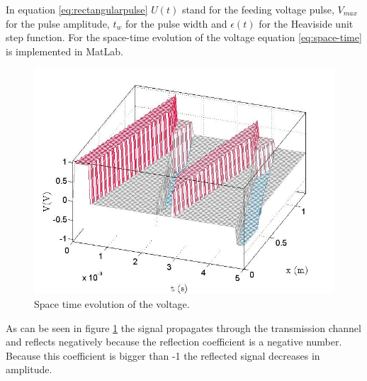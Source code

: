 \documentclass[final]{scrreprt} %
\begin{document}
In equation \ref{eq:rectangularpulse} $U(t)$ stand for the feeding voltage pulse, $V_{max}$ for the pulse amplitude, $t_w$ for the pulse width and $\epsilon(t)$ for the Heaviside unit step function. 
For the space-time evolution of the voltage equation \ref{eq:space-time} is implemented in MatLab. 

\begin{figure}[H]
	\centering
	\includegraphics[width=\linewidth]{resources/task3.png}
	\caption{Space time evolution of the voltage.}
	\label{fig:space-time-voltage}
\end{figure}
As can be seen in figure \ref{fig:space-time-voltage} the signal propagates through the transmission channel and reflects negatively because the reflection coefficient is a negative number. Because this coefficient is bigger than -1 the reflected signal decreases in amplitude.

\\
\end{document}
